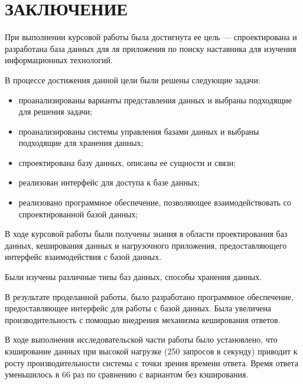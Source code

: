 \chapter*{ЗАКЛЮЧЕНИЕ}

При выполнении курсовой работы была достигнута ее цель --- спроектирована и разработана база данных для ля приложения по поиску наставника для изучения информационных технологий.
    
В процессе достижения данной цели были решены следующие задачи:

\begin{itemize}
	\item проанализированы варианты представления данных и выбраны подходящие для решения задачи;
    \item проанализированы системы управления базами данных и выбраны подходящие для хранения данных;
    \item спроектирована базу данных, описаны ее сущности и связи;
    \item реализован интерфейс для доступа к базе данных;
    \item реализовано программное обеспечение, позволяющее взаимодействовать со спроектированной базой данных;
\end{itemize}

В ходе курсовой работы были получены знания в области проектирования баз данных, кеширования данных и нагрузочного приложения, предоставляющего интерфейс взаимодействия с базой данных.  

Были изучены различные типы баз данных, способы хранения данных.  

В результате проделанной работы, было разработано программное обеспечение, предоставляющее интерфейс для работы с базой данных. Была увеличена производительность с помощью внедрения механизма кеширования ответов.

В ходе выполнения исследовательской части работы было установлено, что кэширование данных при высокой нагрузке (250 запросов в секунду) приводит к росту производительности системы с точки зрения времени ответа.
Время ответа уменьшилось в 66 раз по сравнению с вариантом без кэширования.  
 
